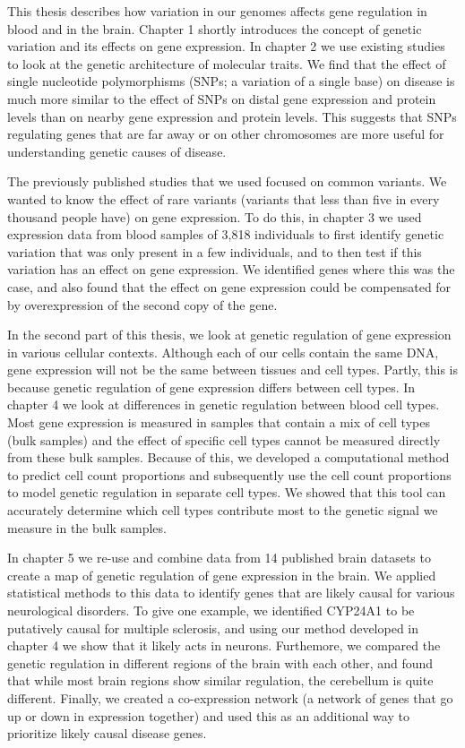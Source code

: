 \begin{appendices}
This thesis describes how variation in our genomes affects gene regulation in blood and in the brain. Chapter 1 shortly introduces the concept of genetic variation and its effects on gene expression. In chapter 2 we use existing studies to look at the genetic architecture of molecular traits. We find that the effect of single nucleotide polymorphisms (SNPs; a variation of a single base) on disease is much more similar to the effect of SNPs on distal gene expression and protein levels than on nearby gene expression and protein levels. This suggests that SNPs regulating genes that are far away or on other chromosomes are more useful for understanding genetic causes of disease.

The previously published studies that we used focused on common variants. We wanted to know the effect of rare variants (variants that less than five in every thousand people have) on gene expression. To do this, in chapter 3 we used expression data from blood samples of 3,818 individuals to first identify genetic variation that was only present in a few individuals, and to then test if this variation has an effect on gene expression. We identified genes where this was the case, and also found that the effect on gene expression could be compensated for by overexpression of the second copy of the gene.

In the second part of this thesis, we look at genetic regulation of gene expression in various cellular contexts. Although each of our cells contain the same DNA, gene expression will not be the same between tissues and cell types. Partly, this is because genetic regulation of gene expression differs between cell types. In chapter 4 we look at differences in genetic regulation between blood cell types. Most gene expression is measured in samples that contain a mix of cell types (bulk samples) and the effect of specific cell types cannot be measured directly from these bulk samples. Because of this, we developed a computational method to predict cell count proportions and subsequently use the cell count proportions to model genetic regulation in separate cell types. We showed that this tool can accurately determine which cell types contribute most to the genetic signal we measure in the bulk samples. 

In chapter 5 we re-use and combine data from 14 published brain datasets to create a map of genetic regulation of gene expression in the brain. We applied statistical methods to this data to identify genes that are likely causal for various neurological disorders. To give one example, we identified CYP24A1 to be putatively causal for multiple sclerosis, and using our method developed in chapter 4 we show that it likely acts in neurons. Furthemore, we compared the genetic regulation in different regions of the brain with each other, and found that while most brain regions show similar regulation, the cerebellum is quite different. Finally, we created a co-expression network (a network of genes that go up or down in expression together) and used this as an additional way to prioritize likely causal disease genes.


\end{appendices}
